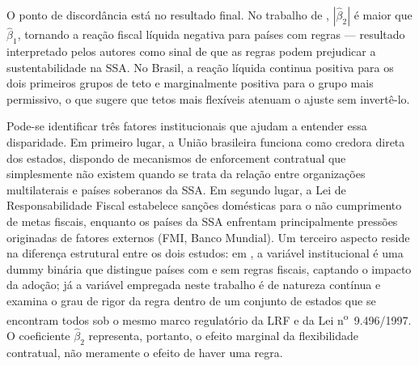 O ponto de discordância está no resultado final. No trabalho de , $|\hat{\beta}_2|$ é maior que $\hat{\beta}_1$, tornando a reação fiscal líquida negativa para países com regras --- resultado interpretado pelos autores como sinal de que as regras podem prejudicar a sustentabilidade na SSA. No Brasil, a reação líquida continua positiva para os dois primeiros grupos de teto e marginalmente positiva para o grupo mais permissivo, o que sugere que tetos mais flexíveis atenuam o ajuste sem invertê-lo.

Pode-se identificar três fatores institucionais que ajudam a entender essa disparidade. Em primeiro lugar, a União brasileira funciona como credora direta dos estados, dispondo de mecanismos de enforcement contratual que simplesmente não existem quando se trata da relação entre organizações multilaterais e países soberanos da SSA. Em segundo lugar, a Lei de Responsabilidade Fiscal estabelece sanções domésticas para o não cumprimento de metas fiscais, enquanto os países da SSA enfrentam principalmente pressões originadas de fatores externos (FMI, Banco Mundial). Um terceiro aspecto reside na diferença estrutural entre os dois estudos: em , a variável institucional é uma dummy binária que distingue países com e sem regras fiscais, captando o impacto da adoção; já a variável empregada neste trabalho é de natureza contínua e examina o grau de rigor da regra dentro de um conjunto de estados que se encontram todos sob o mesmo marco regulatório da LRF e da Lei n\textsuperscript{o}~9.496/1997. O coeficiente $\hat{\beta}_2$ representa, portanto, o efeito marginal da flexibilidade contratual, não meramente o efeito de haver uma regra.
